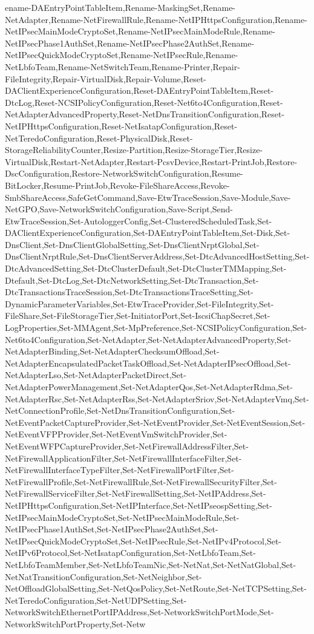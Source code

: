 {ename-DAEntryPointTableItem,Rename-MaskingSet,Rename-NetAdapter,Rename-NetFirewallRule,Rename-NetIPHttpsConfiguration,Rename-NetIPsecMainModeCryptoSet,Rename-NetIPsecMainModeRule,Rename-NetIPsecPhase1AuthSet,Rename-NetIPsecPhase2AuthSet,Rename-NetIPsecQuickModeCryptoSet,Rename-NetIPsecRule,Rename-NetLbfoTeam,Rename-NetSwitchTeam,Rename-Printer,Repair-FileIntegrity,Repair-VirtualDisk,Repair-Volume,Reset-DAClientExperienceConfiguration,Reset-DAEntryPointTableItem,Reset-DtcLog,Reset-NCSIPolicyConfiguration,Reset-Net6to4Configuration,Reset-NetAdapterAdvancedProperty,Reset-NetDnsTransitionConfiguration,Reset-NetIPHttpsConfiguration,Reset-NetIsatapConfiguration,Reset-NetTeredoConfiguration,Reset-PhysicalDisk,Reset-StorageReliabilityCounter,Resize-Partition,Resize-StorageTier,Resize-VirtualDisk,Restart-NetAdapter,Restart-PcsvDevice,Restart-PrintJob,Restore-DscConfiguration,Restore-NetworkSwitchConfiguration,Resume-BitLocker,Resume-PrintJob,Revoke-FileShareAccess,Revoke-SmbShareAccess,SafeGetCommand,Save-EtwTraceSession,Save-Module,Save-NetGPO,Save-NetworkSwitchConfiguration,Save-Script,Send-EtwTraceSession,Set-AutologgerConfig,Set-ClusteredScheduledTask,Set-DAClientExperienceConfiguration,Set-DAEntryPointTableItem,Set-Disk,Set-DnsClient,Set-DnsClientGlobalSetting,Set-DnsClientNrptGlobal,Set-DnsClientNrptRule,Set-DnsClientServerAddress,Set-DtcAdvancedHostSetting,Set-DtcAdvancedSetting,Set-DtcClusterDefault,Set-DtcClusterTMMapping,Set-Dtefault,Set-DtcLog,Set-DtcNetworkSetting,Set-DtcTransaction,Set-DtcTransactionsTraceSession,Set-DtcTransactionsTraceSetting,Set-DynamicParameterVariables,Set-EtwTraceProvider,Set-FileIntegrity,Set-FileShare,Set-FileStorageTier,Set-InitiatorPort,Set-IscsiChapSecret,Set-LogProperties,Set-MMAgent,Set-MpPreference,Set-NCSIPolicyConfiguration,Set-Net6to4Configuration,Set-NetAdapter,Set-NetAdapterAdvancedProperty,Set-NetAdapterBinding,Set-NetAdapterChecksumOffload,Set-NetAdapterEncapsulatedPacketTaskOffload,Set-NetAdapterIPsecOffload,Set-NetAdapterLso,Set-NetAdapterPacketDirect,Set-NetAdapterPowerManagement,Set-NetAdapterQos,Set-NetAdapterRdma,Set-NetAdapterRsc,Set-NetAdapterRss,Set-NetAdapterSriov,Set-NetAdapterVmq,Set-NetConnectionProfile,Set-NetDnsTransitionConfiguration,Set-NetEventPacketCaptureProvider,Set-NetEventProvider,Set-NetEventSession,Set-NetEventVFPProvider,Set-NetEventVmSwitchProvider,Set-NetEventWFPCaptureProvider,Set-NetFirewallAddressFilter,Set-NetFirewallApplicationFilter,Set-NetFirewallInterfaceFilter,Set-NetFirewallInterfaceTypeFilter,Set-NetFirewallPortFilter,Set-NetFirewallProfile,Set-NetFirewallRule,Set-NetFirewallSecurityFilter,Set-NetFirewallServiceFilter,Set-NetFirewallSetting,Set-NetIPAddress,Set-NetIPHttpsConfiguration,Set-NetIPInterface,Set-NetIPseospSetting,Set-NetIPsecMainModeCryptoSet,Set-NetIPsecMainModeRule,Set-NetIPsecPhase1AuthSet,Set-NetIPsecPhase2AuthSet,Set-NetIPsecQuickModeCryptoSet,Set-NetIPsecRule,Set-NetIPv4Protocol,Set-NetIPv6Protocol,Set-NetIsatapConfiguration,Set-NetLbfoTeam,Set-NetLbfoTeamMember,Set-NetLbfoTeamNic,Set-NetNat,Set-NetNatGlobal,Set-NetNatTransitionConfiguration,Set-NetNeighbor,Set-NetOffloadGlobalSetting,Set-NetQosPolicy,Set-NetRoute,Set-NetTCPSetting,Set-NetTeredoConfiguration,Set-NetUDPSetting,Set-NetworkSwitchEthernetPortIPAddress,Set-NetworkSwitchPortMode,Set-NetworkSwitchPortProperty,Set-Netw}
